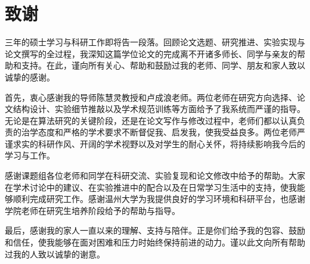 \documentclass{wzuthesis} %
\def\blind{}       %
\begin{document}
\frontmatter
\makefirstpage

\mainmatter













\newpage

\backmatter
\renewcommand{\chaptermark}[1]{\markboth{\songti #1}{}}
\makereferences
\newpage


\newpage

\ifdefined\blind  %
\else
    \chapter{致谢}

    三年的硕士学习与科研工作即将告一段落。回顾论文选题、研究推进、实验实现与论文撰写的全过程，我深知这篇学位论文的完成离不开诸多师长、同学与亲友的帮助和支持。在此，谨向所有关心、帮助和鼓励过我的老师、同学、朋友和家人致以诚挚的感谢。

    首先，衷心感谢我的导师陈慧灵教授和卢成浪老师。两位老师在研究方向选择、论文结构设计、实验细节推敲以及学术规范训练等方面给予了我系统而严谨的指导。无论是在算法研究的关键阶段，还是在论文写作与修改过程中，老师们都以认真负责的治学态度和严格的学术要求不断督促我、启发我，使我受益良多。两位老师严谨求实的科研作风、开阔的学术视野以及对学生的耐心关怀，将持续影响我今后的学习与工作。

    感谢课题组各位老师和同学在科研交流、实验复现和论文修改中给予的帮助。大家在学术讨论中的建议、在实验推进中的配合以及在日常学习生活中的支持，使我能够顺利完成研究工作。感谢温州大学为我提供良好的学习环境和科研平台，也感谢学院老师在研究生培养阶段给予的帮助与指导。

    最后，感谢我的家人一直以来的理解、支持与陪伴。正是你们给予我的包容、鼓励和信任，使我能够在面对困难和压力时始终保持前进的动力。谨以此文向所有帮助过我的人致以诚挚的谢意。
\end{document}
